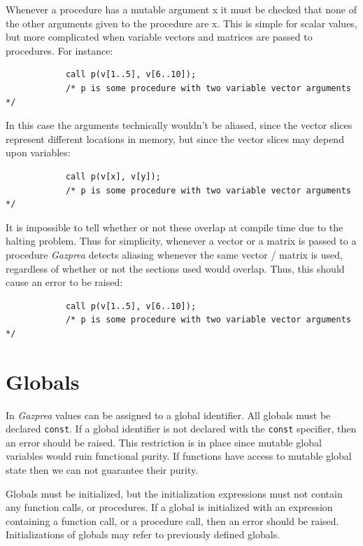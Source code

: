 \documentclass{article}
\begin{document}
		Whenever a procedure has a mutable argument x it must be checked that none of the other arguments given to the
		procedure are x. This is simple for scalar values, but more complicated when variable vectors and matrices are
		passed to procedures. For instance:

		\begin{lstlisting}
			call p(v[1..5], v[6..10]);
			/* p is some procedure with two variable vector arguments */
		\end{lstlisting}

		In this case the arguments technically wouldn't be aliased, since the vector slices represent different
		locations in memory, but since the vector slices may depend upon variables:

		\begin{lstlisting}
			call p(v[x], v[y]);
			/* p is some procedure with two variable vector arguments */
		\end{lstlisting}

		It is impossible to tell whether or not these overlap at compile time due to the halting problem. Thus for
		simplicity, whenever a vector or a matrix is passed to a procedure \textit{Gazprea} detects aliasing whenever the
		same vector / matrix is used, regardless of whether or not the sections used would overlap.  Thus, this should
		cause an error to be raised:

		\begin{lstlisting}
			call p(v[1..5], v[6..10]);
			/* p is some procedure with two variable vector arguments */
		\end{lstlisting}


\section{Globals}\label{sec:global}
	In \textit{Gazprea} values can be assigned to a global identifier. All globals must be declared \texttt{const}. If a
	global identifier is not declared with the \texttt{const} specifier, then an error should be raised. This
	restriction is in place since mutable global variables would ruin functional purity. If functions have access to
	mutable global state then we can not guarantee their purity.

	Globals must be initialized, but the initialization expressions must not contain any function calls, or procedures.
	If a global is initialized with an expression containing a function call, or a procedure call, then an error should
	be raised. Initializations of globals may refer to previously defined globals.
\end{document}
